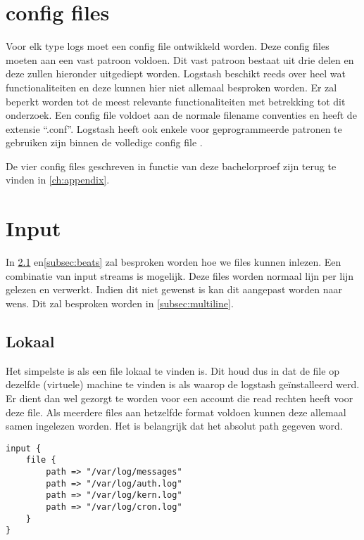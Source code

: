\section{config files}
\label{sec:logstash-config-files}

Voor elk type logs moet een config file ontwikkeld worden. Deze config files moeten aan een vast patroon voldoen. Dit vast patroon bestaat uit drie delen en deze zullen hieronder uitgediept worden. 
Logstash beschikt reeds over heel wat functionaliteiten en deze kunnen hier niet allemaal besproken worden. Er zal beperkt worden tot de meest relevante functionaliteiten met betrekking tot dit onderzoek. Een config file voldoet aan de normale filename conventies en heeft de extensie “.conf”.
Logstash heeft ook enkele voor geprogrammeerde patronen te gebruiken zijn binnen de volledige config file \autocite{logstashpatterns}. 

De vier config files geschreven in functie van deze bachelorproef zijn terug te vinden in \ref{ch:appendix}.

\section{Input}
\label{sec:logstash-input}

In \ref{subsec:lokaal} en\ref{subsec:beats} zal besproken worden hoe we files kunnen inlezen. Een combinatie van input streams is mogelijk. Deze files worden normaal lijn per lijn gelezen en verwerkt. Indien dit niet gewenst is kan dit aangepast worden naar wens. Dit zal besproken worden in \ref{subsec:multiline}.

\subsection{Lokaal}
\label{subsec:lokaal}

Het simpelste is als een file lokaal te vinden is. Dit houd dus in dat  de file op dezelfde (virtuele) machine te vinden is als waarop de logstash geïnstalleerd werd. Er dient dan wel gezorgt te worden voor een account die read rechten heeft voor deze file. Als meerdere files aan hetzelfde format voldoen kunnen deze allemaal samen ingelezen worden.
Het is belangrijk dat het absolut path gegeven word. 
\lstset{escapechar=@,style=customc}        
\begin{lstlisting}[frame=single]  
input {
	file {
		path => "/var/log/messages"
		path => "/var/log/auth.log"
		path => "/var/log/kern.log"
		path => "/var/log/cron.log"
	}
}
\end{lstlisting}

